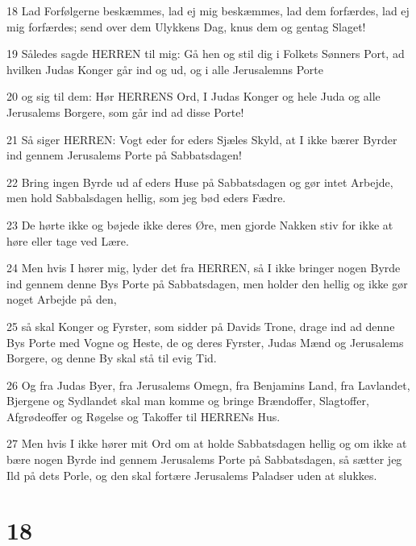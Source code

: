 \par 18 Lad Forfølgerne beskæmmes, lad ej mig beskæmmes, lad dem forfærdes, lad ej mig forfærdes; send over dem Ulykkens Dag, knus dem og gentag Slaget!
\par 19 Således sagde HERREN til mig: Gå hen og stil dig i Folkets Sønners Port, ad hvilken Judas Konger går ind og ud, og i alle Jerusalemns Porte
\par 20 og sig til dem: Hør HERRENS Ord, I Judas Konger og hele Juda og alle Jerusalems Borgere, som går ind ad disse Porte!
\par 21 Så siger HERREN: Vogt eder for eders Sjæles Skyld, at I ikke bærer Byrder ind gennem Jerusalems Porte på Sabbatsdagen!
\par 22 Bring ingen Byrde ud af eders Huse på Sabbatsdagen og gør intet Arbejde, men hold Sabbalsdagen hellig, som jeg bød eders Fædre.
\par 23 De hørte ikke og bøjede ikke deres Øre, men gjorde Nakken stiv for ikke at høre eller tage ved Lære.
\par 24 Men hvis I hører mig, lyder det fra HERREN, så I ikke bringer nogen Byrde ind gennem denne Bys Porte på Sabbatsdagen, men holder den hellig og ikke gør noget Arbejde på den,
\par 25 så skal Konger og Fyrster, som sidder på Davids Trone, drage ind ad denne Bys Porte med Vogne og Heste, de og deres Fyrster, Judas Mænd og Jerusalems Borgere, og denne By skal stå til evig Tid.
\par 26 Og fra Judas Byer, fra Jerusalems Omegn, fra Benjamins Land, fra Lavlandet, Bjergene og Sydlandet skal man komme og bringe Brændoffer, Slagtoffer, Afgrødeoffer og Røgelse og Takoffer til HERRENs Hus.
\par 27 Men hvis I ikke hører mit Ord om at holde Sabbatsdagen hellig og om ikke at bære nogen Byrde ind gennem Jerusalems Porte på Sabbatsdagen, så sætter jeg Ild på dets Porle, og den skal fortære Jerusalems Paladser uden at slukkes.

\chapter{18}

